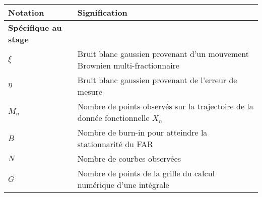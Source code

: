 \begin{table}[H]
	\centering
	\begin{tabularx}{\textwidth}{lX}
		\toprule
		\textbf{Notation}                                & \textbf{Signification}                                                                                                                                                                                                                                  \\
		\midrule
		\textbf{Spécifique au stage}                                                                                                                                                                                                                                                                               \\
		\midrule
		$\xi$                                            & Bruit blanc gaussien provenant d'un mouvement Brownien multi-fractionnaire                                                                                                                                                                              \\
		$\eta$                                           & Bruit blanc gaussien provenant de l'erreur de mesure                                                                                                                                                                                                    \\
		\midrule
		$M_n$                                            & Nombre de points observés sur la trajectoire de la donnée fonctionnelle $X_n$                                                                                                                                                                           \\
		$B$                                              & Nombre de burn-in pour atteindre la stationnarité du FAR                                                                                                                                                                                                \\
		$N$                                              & Nombre de courbes observées                                                                                                                                                                                                                             \\
		$G$                                              & Nombre de points de la grille du calcul numérique d'une intégrale                                                                                                                                                                                       \\

\end{tabularx}
\end{table}
